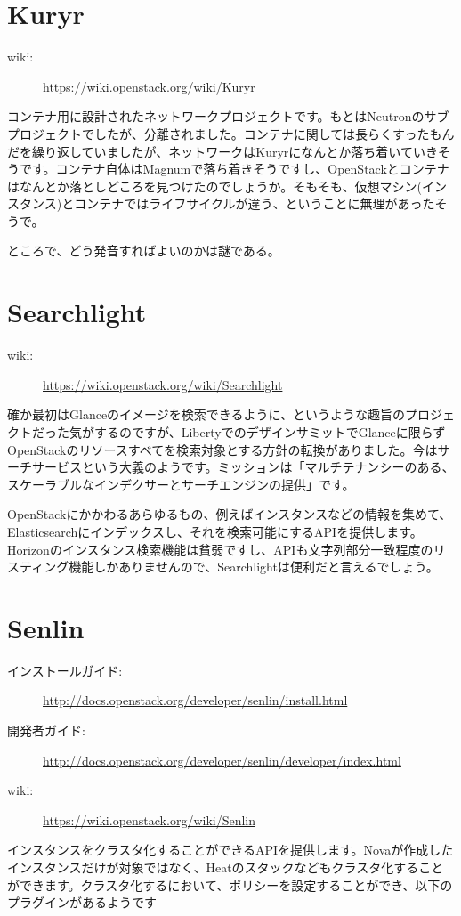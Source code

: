 \section{Kuryr}
\begin{description}
	\item[wiki:] \url{https://wiki.openstack.org/wiki/Kuryr}
\end{description}
コンテナ用に設計されたネットワークプロジェクトです。もとはNeutronのサブプロジェクトでしたが、分離されました。コンテナに関しては長らくすったもんだを繰り返していましたが、ネットワークはKuryrになんとか落ち着いていきそうです。コンテナ自体はMagnumで落ち着きそうですし、OpenStackとコンテナはなんとか落としどころを見つけたのでしょうか。そもそも、仮想マシン(インスタンス)とコンテナではライフサイクルが違う、ということに無理があったそうで。

ところで、どう発音すればよいのかは謎である。

\section{Searchlight}
\begin{description}
	\item[wiki:] \url{https://wiki.openstack.org/wiki/Searchlight}
\end{description}
確か最初はGlanceのイメージを検索できるように、というような趣旨のプロジェクトだった気がするのですが、LibertyでのデザインサミットでGlanceに限らずOpenStackのリソースすべてを検索対象とする方針の転換がありました。今はサーチサービスという大義のようです。ミッションは「マルチテナンシーのある、スケーラブルなインデクサーとサーチエンジンの提供」です。

OpenStackにかかわるあらゆるもの、例えばインスタンスなどの情報を集めて、Elasticsearchにインデックスし、それを検索可能にするAPIを提供します。Horizonのインスタンス検索機能は貧弱ですし、APIも文字列部分一致程度のリスティング機能しかありませんので、Searchlightは便利だと言えるでしょう。

\section{Senlin}
\begin{description}
	\item[インストールガイド:] \url{http://docs.openstack.org/developer/senlin/install.html}
	\item[開発者ガイド:] \url{http://docs.openstack.org/developer/senlin/developer/index.html}
	\item[wiki:] \url{https://wiki.openstack.org/wiki/Senlin}
\end{description}
インスタンスをクラスタ化することができるAPIを提供します。Novaが作成したインスタンスだけが対象ではなく、Heatのスタックなどもクラスタ化することができます。クラスタ化するにおいて、ポリシーを設定することができ、以下のプラグインがあるようです

